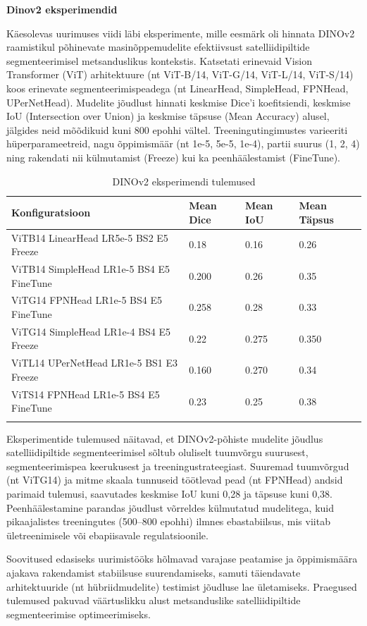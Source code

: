 \textbf{Dinov2 eksperimendid}

Käesolevas uurimuses viidi läbi eksperimente, mille eesmärk oli hinnata DINOv2
raamistikul põhinevate masinõppemudelite efektiivsust satelliidipiltide
segmenteerimisel metsanduslikus kontekstis. Katsetati erinevaid Vision
Transformer (ViT) arhitektuure (nt ViT-B/14, ViT-G/14, ViT-L/14, ViT-S/14) koos
erinevate segmenteerimispeadega (nt LinearHead, SimpleHead, FPNHead,
UPerNetHead). Mudelite jõudlust hinnati keskmise Dice'i koefitsiendi, keskmise
IoU (Intersection over Union) ja keskmise täpsuse (Mean Accuracy) alusel,
jälgides neid mõõdikuid kuni 800 epohhi vältel. Treeningutingimustes varieeriti
hüperparameetreid, nagu õppimismäär (nt 1e-5, 5e-5, 1e-4), partii suurus (1, 2,
4) ning rakendati nii külmutamist (Freeze) kui ka peenhäälestamist (FineTune).

\bigskip
\begin{longtable}{llll}
    \textbf{Konfiguratsioon} & \textbf{Mean Dice} & \textbf{Mean IoU} & \textbf{Mean Täpsus} \\
    \hline
    ViTB14 LinearHead LR5e-5 BS2 E5 Freeze & 0.18 & 0.16 & 0.26 \\
    ViTB14 SimpleHead LR1e-5 BS4 E5 FineTune & 0.200 & 0.26 & 0.35 \\
    ViTG14 FPNHead LR1e-5 BS4 E5 FineTune & 0.258 & 0.28 & 0.33 \\
    ViTG14 SimpleHead LR1e-4 BS4 E5 Freeze & 0.22 & 0.275 & 0.350 \\
    ViTL14 UPerNetHead LR1e-5 BS1 E3 Freeze & 0.160 & 0.270 & 0.34 \\
    ViTS14 FPNHead LR1e-5 BS4 E5 FineTune & 0.23 & 0.25 & 0.38 \\
    \hline
    \caption{DINOv2 eksperimendi tulemused}
    \label{tab:dinov2_results}
\end{longtable}
\bigskip

Eksperimentide tulemused näitavad, et DINOv2-põhiste mudelite jõudlus satelliidipiltide segmenteerimisel sõltub oluliselt tuumvõrgu suurusest, segmenteerimispea keerukusest ja treeningustrateegiast. Suuremad tuumvõrgud (nt ViTG14) ja mitme skaala tunnuseid töötlevad pead (nt FPNHead) andsid parimaid tulemusi, saavutades keskmise IoU kuni 0,28 ja täpsuse kuni 0,38. Peenhäälestamine parandas jõudlust võrreldes külmutatud mudelitega, kuid pikaajalistes treeningutes (500–800 epohhi) ilmnes ebastabiilsus, mis viitab ületreenimisele või ebapiisavale regulatsioonile.

Soovitused edasiseks uurimistööks hõlmavad varajase peatamise ja õppimismäära ajakava rakendamist stabiilsuse suurendamiseks, samuti täiendavate arhitektuuride (nt hübriidmudelite) testimist jõudluse lae ületamiseks. Praegused tulemused pakuvad väärtuslikku alust metsanduslike satelliidipiltide segmenteerimise optimeerimiseks.

